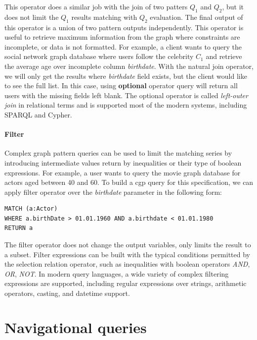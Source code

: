 This operator does a similar job with the join of two patters $Q_1$ and $Q_2$, but it does not limit the $Q_1$ results matching with $Q_2$ evaluation.
The final output of this operator is a union of two pattern outputs independently.
This operator is useful to retrieve maximum information from the graph where constraints are incomplete, or data is not formatted.
For example, a client wants to query the social network graph database where users follow the celebrity $C_1$ and retrieve the average age over incomplete column \textit{birthdate}.
With the natural join operator, we will only get the results where \textit{birthdate} field exists, but the client would like to see the full list.
In this case, using \textbf{optional} operator query will return all users with the missing fields left blank.
The optional operator is called \textit{left-outer join} in relational terms and is supported most of the modern systems, including SPARQL and Cypher.

\paragraph{Filter}

Complex graph pattern queries can be used to limit the matching series by introducing intermediate values return by inequalities or their type of boolean expressions.
For example, a user wants to query the movie graph database for actors aged between 40 and 60.
To build a cgp query for this specification, we can apply filter operator over the \textit{birthdate} parameter in the following form:

\begin{lstlisting}[language=Cypher,frame=single,caption={Filtering over the birthdate parameter in Cypher}]
MATCH (a:Actor)
WHERE a.birthDate > 01.01.1960 AND a.birthdate < 01.01.1980
RETURN a
\end{lstlisting}

The filter operator does not change the output variables, only limits the result to a subset.
Filter expressions can be built with the typical conditions permitted by the selection relation operator, such as inequalities with boolean operators \textit{AND}, \textit{OR}, \textit{NOT}.
In modern query languages, a wide variety of complex filtering expressions are supported, including regular expressions over strings, arithmetic operators, casting, and datetime support.

\section{Navigational queries}

